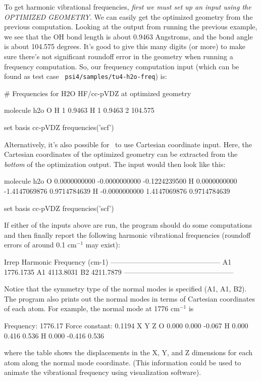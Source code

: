 To get harmonic vibrational frequencies, {\em first we must set up an input
using the OPTIMIZED GEOMETRY}.  We can easily get the optimized geometry
from the previous computation.  Looking at the output from running the
previous example, we see that the OH bond length is about 0.9463 Angstroms,
and the bond angle is about 104.575 degrees.  It's good to give this many
digits (or more) to make sure there's not significant roundoff error in the
geometry when running a frequency computation.  So, our frequency
computation input (which can be found as test case {\tt
psi4/samples/tu4-h2o-freq}) is:
\begin{Snippet}
# Frequencies for H2O HF/cc-pVDZ at optimized geometry

molecule h2o {
  O
  H 1 0.9463
  H 1 0.9463 2 104.575
}

set basis cc-pVDZ
frequencies('scf')
\end{Snippet}
Alternatively, it's also possible for \PSIfour\ to use Cartesian coordinate
input.  Here, the Cartesian coordinates of the optimized geometry can be
extracted from the {\em bottom} of the optimization output.  The input 
would then look like
this:
\begin{Snippet}
molecule h2o {
  O     0.0000000000  -0.0000000000  -0.1224239500
  H     0.0000000000  -1.4147069876   0.9714784639
  H    -0.0000000000   1.4147069876   0.9714784639
}

set basis cc-pVDZ
frequencies('scf')
\end{Snippet}
If either of the inputs above are run, the program should do some
computations and then finally report the following harmonic vibrational
frequencies (roundoff errors of around 0.1 cm$^{-1}$ may exist):
\begin{Snippet}
          Irrep      Harmonic Frequency
                          (cm-1)
        -----------------------------------------------
             A1         1776.1735
             A1         4113.8031
             B2         4211.7879
        -----------------------------------------------
\end{Snippet}
Notice that the symmetry type of the normal modes is specified (A1, A1,
B2).  The program also prints out the normal modes in terms of Cartesian
coordinates of each atom.  For example, the normal mode at 1776 cm$^{-1}$
is
\begin{Snippet}
   Frequency:       1776.17
   Force constant:   0.1194
             X       Y       Z
  O        0.000   0.000  -0.067
  H        0.000   0.416   0.536
  H        0.000  -0.416   0.536
\end{Snippet}
where the table shows the displacements in the X, Y, and Z dimensions for
each atom along the normal mode coordinate.  (This information could be used
to animate the vibrational frequency using visualization software).


